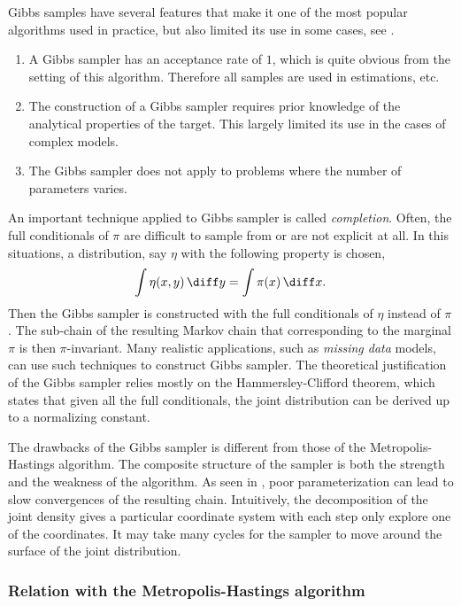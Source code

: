 Gibbs samples have several features that make it one of the most popular \mcmc
algorithms used in practice, but also limited its use in some cases, see
\cite[][sec.~10.1.1]{Robert:2004tn}.
\begin{enumerate}
  \item A Gibbs sampler has an acceptance rate of $1$, which is quite obvious
    from the setting of this algorithm. Therefore all samples are used in
    estimations, etc.
  \item The construction of a Gibbs sampler requires prior knowledge of the
    analytical properties of the target. This largely limited its use in the
    cases of complex models.
  \item The Gibbs sampler does not apply to problems where the number of
    parameters varies.
\end{enumerate}

An important technique applied to Gibbs sampler is called \emph{completion}.
Often, the full conditionals of $\pi$ are difficult to sample from or are not
explicit at all. In this situations, a distribution, say $\eta$ with the
following property is chosen,
\begin{equation}
  \int\eta(x,y)\intd y = \int\pi(x)\intd x.
\end{equation}
Then the Gibbs sampler is constructed with the full conditionals of $\eta$
instead of $\pi$. The sub-chain of the resulting Markov chain that
corresponding to the marginal $\pi$ is then $\pi$-invariant. Many realistic
applications, such as \emph{missing data} models, can use such techniques to
construct Gibbs sampler. The theoretical justification of the Gibbs sampler
relies mostly on the Hammersley-Clifford theorem, which states that given all
the full conditionals, the joint distribution can be derived up to a
normalizing constant.

The drawbacks of the Gibbs sampler is different from those of the
Metropolis-Hastings algorithm. The composite structure of the sampler is both
the strength and the weakness of the algorithm. As seen in
\cite{Hills:1993vb}, poor parameterization can lead to slow convergences of
the resulting chain. Intuitively, the decomposition of the joint density gives
a particular coordinate system with each step only explore one of the
coordinates. It may take many cycles for the sampler to move around the
surface of the joint distribution.

\subsubsection{Relation with the Metropolis-Hastings algorithm}
\label{ssub:Relation with the Metropolis-Hastings algorithm}

